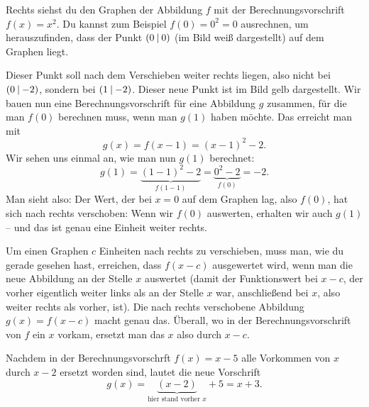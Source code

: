 \documentclass[../../main.tex]{subfiles}
\begin{document}
\begin{example}

    Rechts siehst du den Graphen der Abbildung $f$ mit der Berechnungsvorschrift $f(x)=x^2$. Du kannst zum Beispiel $f(0)=0^2=0$ ausrechnen, um herauszufinden, dass der Punkt $\left(0 \:\middle|\: 0\right)$ (im Bild weiß dargestellt) auf dem Graphen liegt.
    
    Dieser Punkt soll nach dem Verschieben weiter rechts liegen, also nicht bei $\left(0 \:\middle|\: -2\right)$, sondern bei $\left(1 \:\middle|\: -2\right)$. Dieser neue Punkt ist im Bild gelb dargestellt. Wir bauen nun eine Berechnungsvorschrift für eine Abbildung $g$ zusammen, für die man $f(0)$ berechnen muss, wenn man $g(1)$ haben möchte. Das erreicht man mit \[g(x)=f(x-1)=(x-1)^2-2.\]
    Wir sehen uns einmal an, wie man nun $g(1)$ berechnet: \[g(1)=\underbrace{(1-1)^2-2}_{f(1-1)}=\underbrace{0^2-2}_{f(0)}=-2.\]
    Man sieht also: Der Wert, der bei $x=0$ auf dem Graphen lag, also $f(0)$, hat sich nach rechts verschoben: Wenn wir $f(0)$ auswerten, erhalten wir auch $g(1)$ -- und das ist genau eine Einheit weiter rechts.
\end{example}

Um einen Graphen $c$ Einheiten nach rechts zu verschieben, muss man, wie du gerade gesehen hast, erreichen, dass $f(x-c)$ ausgewertet wird, wenn man die neue Abbildung an der Stelle $x$ auswertet (damit der Funktionswert bei $x-c$, der vorher eigentlich weiter links als an der Stelle $x$ war, anschließend bei $x$, also weiter rechts als vorher, ist). Die nach rechts verschobene Abbildung $g(x)=f(x-c)$ macht genau das. Überall, wo in der Berechnungsvorschrift von $f$ ein $x$ vorkam, ersetzt man das $x$ also durch $x-c$.

\begin{example}
    Nachdem in der Berechnungsvorschrft $f(x)=x-5$ alle Vorkommen von $x$ durch $x-2$ ersetzt worden sind, lautet die neue Vorschrift 
    \[g(x)=\underbrace{(x-2)}_{\text{hier stand vorher }x}+5=x+3.\]
\end{example}
\end{document}
